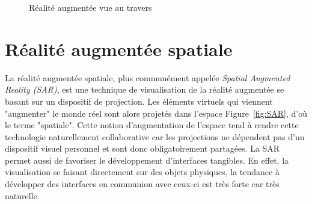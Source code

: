 \begin{figure}[H]
    \centering
\caption{Réalité augmentée vue au travers\protect\footnotemark}
\label{fig:STAR}
\end{figure}

\section{Réalité augmentée spatiale}
La réalité augmentée spatiale\cite{bimber2005spatial}, plus communément appelée \emph{Spatial Augmented Reality (SAR)}, est une technique de visualisation de la réalité augmentée se basant sur un dispositif de projection. Les éléments virtuels qui viennent "augmenter" le monde réel sont alors projetés dans l'espace Figure~\ref{fig:SAR}, d'où le terme "spatiale". Cette notion d'augmentation de l'espace tend à rendre cette technologie naturellement collaborative car les projections ne dépendent pas d'un dispositif visuel personnel et sont donc obligatoirement partagées. La SAR permet aussi de favoriser le développement d'interfaces tangibles. En effet, la visualisation se faisant directement sur des objets physiques, la tendance à développer des interfaces en communion avec ceux-ci est très forte car très naturelle.

